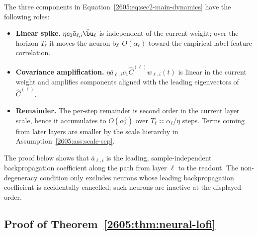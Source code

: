 \begin{remark}
The three components in Equation~\eqref{2605:eq:sec2-main-dynamics} have the following roles:
\begin{itemize}
\item \textbf{Linear spike.} $\eta c_0 \bar{a}_{\ell,i}\hat{\bu}_\ell$ is independent of the current weight; over the horizon $T_\ell$ it moves the neuron by $O(\alpha_\ell)$ toward the empirical label-feature correlation.
\item \textbf{Covariance amplification.} $\eta \bar{a}_{\ell,i} c_1\widehat{C}^{(\ell)}w_{\ell,i}(t)$ is linear in the current weight and amplifies components aligned with the leading eigenvectors of $\widehat{C}^{(\ell)}$.
\item \textbf{Remainder.} The per-step remainder is second order in the current
layer scale, hence it accumulates to \(O(\alpha_\ell^3)\) over
\(T_\ell\asymp \alpha_\ell/\eta\) steps. Terms coming from later layers are
smaller by the scale hierarchy in Assumption~\ref{2605:ass:scale-sep}.
\end{itemize}
The proof below shows that \(\bar a_{\ell,i}\) is the leading, sample-independent
backpropagation coefficient along the path from layer \(\ell\) to the readout.
The non-degeneracy condition only excludes neurons whose leading
backpropagation coefficient is accidentally cancelled; such neurons are inactive
at the displayed order.
\end{remark}

\subsection{Proof of Theorem~\ref{2605:thm:neural-lofi}}

